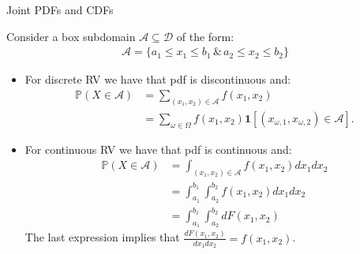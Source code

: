 \documentclass[handout,9pt]{beamer}
\begin{document}
%
\begin{frame}{Joint PDFs and CDFs}

Consider a box subdomain $\mathcal{A}\subseteq\mathcal{D}$ of the form:
\begin{align*}
\mathcal{A}=\{a_1 \leq x_1\leq b_1 \, \&\, a_2 \leq x_2\leq b_2\}
\end{align*}

\begin{itemize}

\item For discrete RV we have that pdf is discontinuous and:
\begin{align*}
\mathbb{P}(X\in \mathcal{A})&=\sum_{(x_1,x_2)\in \mathcal{A}}f(x_1,x_2)\\
&=\sum_{\omega \in \Omega}f(x_1,x_2)\mathbf{1}[(x_{\omega,1},x_{\omega,2})\in \mathcal{A}].
\end{align*}

\item For continuous RV we have that pdf is continuous and:
\begin{align*}
\mathbb{P}(X\in \mathcal{A})&=\int_{(x_1,x_2)\in \mathcal{A}}f(x_1,x_2)dx_1dx_2\\
&=\int_{a_1}^{b_1}\int_{a_2}^{b_2}f(x_1,x_2)dx_1dx_2\\
&=\int_{a_1}^{b_1}\int_{a_2}^{b_2}dF(x_1,x_2)
\end{align*}
The last expression implies that $\frac{dF(x_1,x_2)}{dx_1dx_2}=f(x_1,x_2)$.

\end{itemize}

\end{frame}
\end{document}
